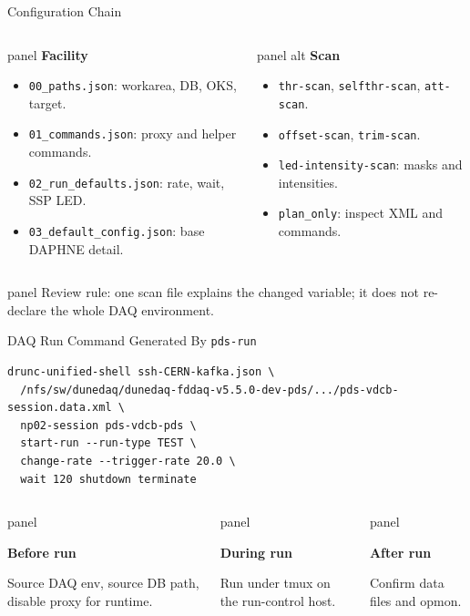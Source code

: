 \documentclass[aspectratio=169,10pt]{beamer}
\newcommand{\panelbox}[3][panel]{%
  \begin{beamercolorbox}[wd=\linewidth,sep=6pt,rounded=true]{#1}
    {\color{noircyan}\bfseries #2\par}
    \vspace{0.5mm}
    {\small #3\par}
  \end{beamercolorbox}
}
\begin{document}
\begin{frame}[t]{Configuration Chain}
\begin{columns}[T,onlytextwidth]
\begin{beamercolorbox}[wd=\linewidth,sep=6pt,rounded=true]{panel}
\footnotesize
\textcolor{noircyan}{\textbf{Facility}}
\begin{itemize}
  \item \texttt{00\_paths.json}: workarea, DB, OKS, target.
  \item \texttt{01\_commands.json}: proxy and helper commands.
  \item \texttt{02\_run\_defaults.json}: rate, wait, SSP LED.
  \item \texttt{03\_default\_config.json}: base DAPHNE detail.
\end{itemize}
\end{beamercolorbox}

\begin{beamercolorbox}[wd=\linewidth,sep=6pt,rounded=true]{panel alt}
\footnotesize
\textcolor{noircyan}{\textbf{Scan}}
\begin{itemize}
  \item \texttt{thr-scan}, \texttt{selfthr-scan}, \texttt{att-scan}.
  \item \texttt{offset-scan}, \texttt{trim-scan}.
  \item \texttt{led-intensity-scan}: masks and intensities.
  \item \texttt{plan\_only}: inspect XML and commands.
\end{itemize}
\end{beamercolorbox}
\end{columns}

\vspace{2mm}
\begin{beamercolorbox}[wd=\linewidth,sep=6pt,rounded=true]{panel}
\footnotesize
Review rule: one scan file explains the changed variable; it does not re-declare the whole DAQ environment.
\end{beamercolorbox}
\end{frame}

\begin{frame}[fragile,t]{DAQ Run Command Generated By \texttt{pds-run}}
\begin{lstlisting}[style=terminal]
drunc-unified-shell ssh-CERN-kafka.json \
  /nfs/sw/dunedaq/dunedaq-fddaq-v5.5.0-dev-pds/.../pds-vdcb-session.data.xml \
  np02-session pds-vdcb-pds \
  start-run --run-type TEST \
  change-rate --trigger-rate 20.0 \
  wait 120 shutdown terminate
\end{lstlisting}

\vspace{2mm}
\begin{columns}[T,onlytextwidth]
\panelbox{Before run}{Source DAQ env, source DB path, disable proxy for runtime.}
\column{0.32\textwidth}
\panelbox{During run}{Run under tmux on the run-control host.}
\column{0.32\textwidth}
\panelbox{After run}{Confirm data files and opmon.}
\end{columns}
\end{frame}
\end{document}
